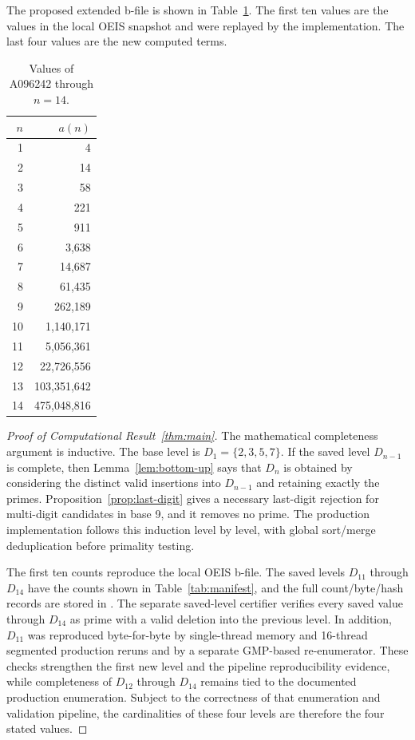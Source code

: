 \documentclass[11pt]{article}
\theoremstyle{definition}
\theoremstyle{remark}
\begin{document}
The proposed extended b-file is shown in Table~\ref{tab:terms}.  The first
ten values are the values in the local OEIS snapshot and were replayed by
the implementation.  The last four values are the new computed terms.

\begin{table}[H]
\centering
\begin{tabular}{rr}
\toprule
\(n\) & \(a(n)\)\\
\midrule
1 & 4\\
2 & 14\\
3 & 58\\
4 & 221\\
5 & 911\\
6 & 3,638\\
7 & 14,687\\
8 & 61,435\\
9 & 262,189\\
10 & 1,140,171\\
11 & 5,056,361\\
12 & 22,726,556\\
13 & 103,351,642\\
14 & 475,048,816\\
\bottomrule
\end{tabular}
\caption{Values of A096242 through \(n=14\).}
\label{tab:terms}
\end{table}

\begin{proof}[Proof of Computational Result~\ref{thm:main}]
The mathematical completeness argument is inductive.  The base level is
\(D_1=\{2,3,5,7\}\).  If the saved level \(D_{n-1}\) is complete, then
Lemma~\ref{lem:bottom-up} says that \(D_n\) is obtained by considering the
distinct valid insertions into \(D_{n-1}\) and retaining exactly the primes.
Proposition~\ref{prop:last-digit} gives a necessary last-digit rejection for
multi-digit candidates in base 9, and it removes no prime.  The production
implementation follows this induction level by level, with global sort/merge
deduplication before primality testing.

The first ten counts reproduce the local OEIS b-file.  The saved levels
\(D_{11}\) through \(D_{14}\) have the counts shown in
Table~\ref{tab:manifest}, and the full count/byte/hash records are stored in
.  The separate saved-level certifier verifies
every saved value through \(D_{14}\) as prime with a valid deletion into the
previous level.  In addition, \(D_{11}\) was reproduced byte-for-byte by
single-thread memory and 16-thread segmented production reruns and by a
separate GMP-based re-enumerator.  These checks strengthen the first new
level and the pipeline reproducibility evidence, while completeness of
\(D_{12}\) through \(D_{14}\) remains tied to the documented production
enumeration.  Subject to the correctness of that enumeration and validation
pipeline, the cardinalities of these four levels are therefore the four
stated values.
\end{proof}
\end{document}
